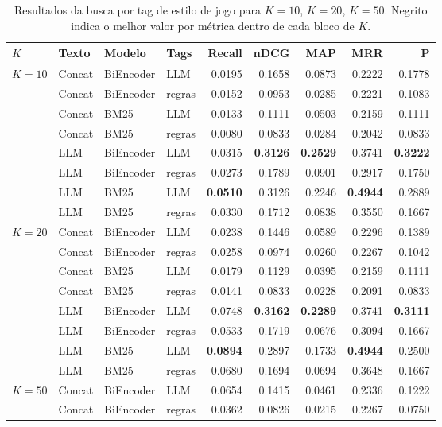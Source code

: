 \begin{table}[h]
\centering
\caption{Resultados da busca por tag de estilo de jogo para $K=10$, $K=20$, $K=50$. Negrito indica o melhor valor por métrica dentro de cada bloco de $K$.}
\label{tab:tag-search-combined}
\begin{tabular}{llllrrrrr}
\toprule
$K$ & Texto & Modelo & Tags & Recall & nDCG & MAP & MRR & P \\
\midrule
\multirow{8}{*}{$K=10$} & Concat & BiEncoder & LLM & 0.0195 & 0.1658 & 0.0873 & 0.2222 & 0.1778 \\
 & Concat & BiEncoder & regras & 0.0152 & 0.0953 & 0.0285 & 0.2221 & 0.1083 \\
 & Concat & BM25 & LLM & 0.0133 & 0.1111 & 0.0503 & 0.2159 & 0.1111 \\
 & Concat & BM25 & regras & 0.0080 & 0.0833 & 0.0284 & 0.2042 & 0.0833 \\
 & LLM & BiEncoder & LLM & 0.0315 & \textbf{0.3126} & \textbf{0.2529} & 0.3741 & \textbf{0.3222} \\
 & LLM & BiEncoder & regras & 0.0273 & 0.1789 & 0.0901 & 0.2917 & 0.1750 \\
 & LLM & BM25 & LLM & \textbf{0.0510} & 0.3126 & 0.2246 & \textbf{0.4944} & 0.2889 \\
 & LLM & BM25 & regras & 0.0330 & 0.1712 & 0.0838 & 0.3550 & 0.1667 \\
\midrule
\multirow{8}{*}{$K=20$} & Concat & BiEncoder & LLM & 0.0238 & 0.1446 & 0.0589 & 0.2296 & 0.1389 \\
 & Concat & BiEncoder & regras & 0.0258 & 0.0974 & 0.0260 & 0.2267 & 0.1042 \\
 & Concat & BM25 & LLM & 0.0179 & 0.1129 & 0.0395 & 0.2159 & 0.1111 \\
 & Concat & BM25 & regras & 0.0141 & 0.0833 & 0.0228 & 0.2091 & 0.0833 \\
 & LLM & BiEncoder & LLM & 0.0748 & \textbf{0.3162} & \textbf{0.2289} & 0.3741 & \textbf{0.3111} \\
 & LLM & BiEncoder & regras & 0.0533 & 0.1719 & 0.0676 & 0.3094 & 0.1667 \\
 & LLM & BM25 & LLM & \textbf{0.0894} & 0.2897 & 0.1733 & \textbf{0.4944} & 0.2500 \\
 & LLM & BM25 & regras & 0.0680 & 0.1694 & 0.0694 & 0.3648 & 0.1667 \\
\midrule
\multirow{8}{*}{$K=50$} & Concat & BiEncoder & LLM & 0.0654 & 0.1415 & 0.0461 & 0.2336 & 0.1222 \\
 & Concat & BiEncoder & regras & 0.0362 & 0.0826 & 0.0215 & 0.2267 & 0.0750 \\

\end{tabular}
\end{table}
